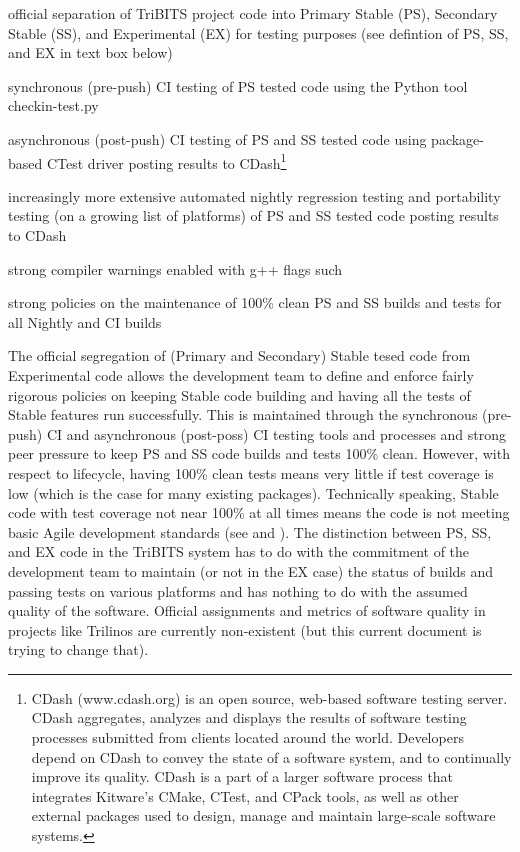 \documentclass[11pt]{SANDreport}
\begin{document}
\begin{compactitem}

{}\item official separation of TriBITS project code into Primary Stable (PS),
Secondary Stable (SS), and Experimental (EX) for testing purposes (see
defintion of PS, SS, and EX in text box below)

{}\item synchronous (pre-push) CI testing of PS tested code using the
Python tool checkin-test.py

{}\item asynchronous (post-push) CI testing of PS and SS tested code
using package-based CTest driver posting results to
CDash\footnote{CDash (www.cdash.org) is an open source, web-based
software testing server. CDash aggregates, analyzes and displays the
results of software testing processes submitted from clients located
around the world. Developers depend on CDash to convey the state of a
software system, and to continually improve its quality. CDash is a
part of a larger software process that integrates Kitware's CMake,
CTest, and CPack tools, as well as other external packages used to
design, manage and maintain large-scale software systems.}

{}\item increasingly more extensive automated nightly regression
testing and portability testing (on a growing list of platforms) of PS
and SS tested code posting results to CDash

{}\item strong compiler warnings enabled with g++ flags such
{}

{}\item strong policies on the maintenance of 100\% clean PS and SS
builds and tests for all Nightly and CI builds

\end{compactitem}

The official segregation of (Primary and Secondary) Stable tesed code
from Experimental code allows the development team to define and
enforce fairly rigorous policies on keeping Stable code building and
having all the tests of Stable features run successfully.  This is
maintained through the synchronous (pre-push) CI and asynchronous
(post-poss) CI testing tools and processes and strong peer pressure to
keep PS and SS code builds and tests 100\% clean.  However, with
respect to lifecycle, having 100\% clean tests means very little if
test coverage is low (which is the case for many existing packages).
Technically speaking, Stable code with test coverage not near 100\% at
all times means the code is not meeting basic Agile development
standards (see {}\cite{XP2} and {}\cite{CodeComplete2nd04}).  The
distinction between PS, SS, and EX code in the TriBITS system has to
do with the commitment of the development team to maintain (or not in
the EX case) the status of builds and passing tests on various
platforms and has nothing to do with the assumed quality of the
software.  Official assignments and metrics of software quality in
projects like Trilinos are currently non-existent (but this current
document is trying to change that).
\end{document}

